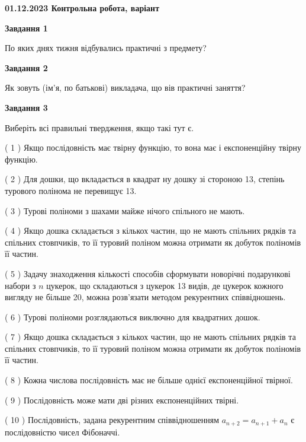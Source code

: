 \documentclass[12pt, ukrainian]{article}
\begin{document}
\begin {large}

\textbf{01.12.2023 Контрольна робота, варіант  }\par


{
{\begin {center}\textbf{Завдання 1}\end {center}}\par
По яких днях тижня відбувались практичні з предмету?\par
{\begin {center}\textbf{Завдання 2}\end {center}}\par
Як зовуть (ім'я, по батькові) викладача, що вів практичні заняття?\par
{\begin {center}\textbf{Завдання 3}\end {center}}\par
Виберіть всі правильні твердження, якщо такі тут є.\par
\vspace{2mm}
( 1 ) Якщо послідовність має твірну функцію, то вона має і експоненційну твірну функцію.%

( 2 ) Для дошки, що вкладається в квадрат ну дошку зі стороною 13, степінь турового полінома не перевищує 13.%

( 3 ) Турові поліноми з шахами майже нічого спільного не мають.%

( 4 ) Якщо дошка складається з кількох частин, що не мають спільних рядків та спільних стовпчиків, то її туровий поліном можна отримати як добуток поліномів її частин.%

( 5 ) Задачу знаходження кількості способів сформувати новорічні подарункові набори з $n$ цукерок, що складаються з цукерок 13 видів, де цукерок кожного вигляду не більше 20, можна розв’язати методом рекурентних співвідношень.%

( 6 ) Турові поліноми розглядаються виключно для квадратних дошок.%

( 7 ) Якщо дошка складається з кількох частин, що не мають спільних рядків та спільних стовпчиків, то її туровий поліном можна отримати як добуток поліномів її частин.%

( 8 ) Кожна числова послідовність має не більше однієї  експоненційної твірної.%

( 9 ) Послідовність може мати дві різних експоненційних твірні.%

( 10 ) Послідовність, задана рекурентним співвідношенням $a_{n+2}=a_{n+1}+a_{n}$ є послідовністю чисел Фібоначчі.%
}
\end {large}

\vspace{4mm}
\newpage
\end{document}

